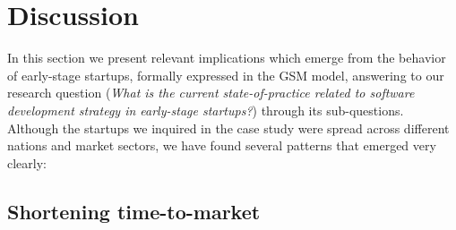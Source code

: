 \documentclass[10pt,journal,letterpaper,compsoc]{IEEEtran}
\begin{document}
\section{Discussion} %
\label{sect:theory:impl}


In this section we present relevant implications which 
emerge from the behavior of early-stage startups, formally expressed in the GSM 
model, answering to our research question (\textit{What is the current 
state-of-practice related to software development strategy in early-stage 
startups?}) through its sub-questions. Although the startups we inquired in the 
case study were spread across different nations and market sectors, we have 
found several patterns that emerged very clearly:

\subsection{Shortening time-to-market}
\end{document}
